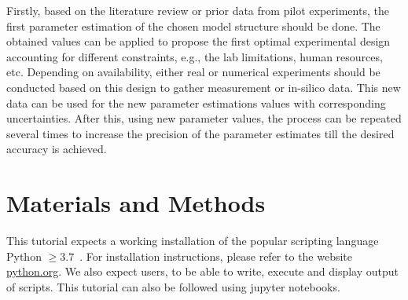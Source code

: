\documentclass[10pt,A4paper]{article}
\begin{document}
Firstly, based on the literature review or prior data from pilot experiments, the first parameter estimation of the chosen model structure should be done.
The obtained values can be applied to propose the first optimal experimental design accounting for different constraints, e.g., the lab limitations, human resources, etc. 
Depending on availability, either real or numerical experiments should be conducted based on this design to gather measurement or in-silico data. 
This new data can be used for the new parameter estimations values with corresponding uncertainties.
After this, using new parameter values, the process can be repeated several times to increase the precision of the parameter estimates till the desired accuracy is achieved.
%
%
%
\section*{Materials and Methods}
This tutorial expects a working installation of the popular scripting language Python $\geq3.7$~\cite{rossumPythonLanguageReference2010}.
For installation instructions, please refer to the website \href{https://www.python.org/downloads/}{python.org}.
We also expect users, to be able to write, execute and display output of scripts.
This tutorial can also be followed using jupyter notebooks.
\end{document}
